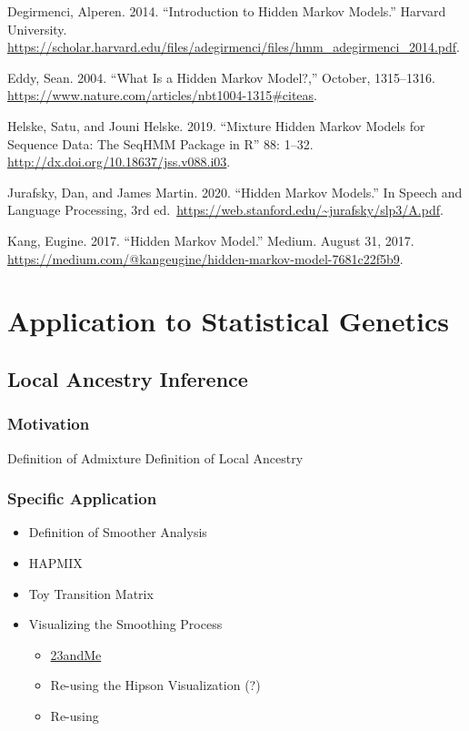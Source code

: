 \documentclass[
]{book}
\providecommand{\tightlist}{%
  \setlength{\itemsep}{0pt}\setlength{\parskip}{0pt}}
\begin{document}
Degirmenci, Alperen. 2014. ``Introduction to Hidden Markov Models.'' Harvard University. \url{https://scholar.harvard.edu/files/adegirmenci/files/hmm_adegirmenci_2014.pdf}.

Eddy, Sean. 2004. ``What Is a Hidden Markov Model?,'' October, 1315--1316. \url{https://www.nature.com/articles/nbt1004-1315\#citeas}.

Helske, Satu, and Jouni Helske. 2019. ``Mixture Hidden Markov Models for Sequence Data: The SeqHMM Package in R'' 88: 1--32. \url{http://dx.doi.org/10.18637/jss.v088.i03}.

Jurafsky, Dan, and James Martin. 2020. ``Hidden Markov Models.'' In Speech and Language Processing, 3rd ed.~\url{https://web.stanford.edu/~jurafsky/slp3/A.pdf}.

Kang, Eugine. 2017. ``Hidden Markov Model.'' Medium. August 31, 2017. \url{https://medium.com/@kangeugine/hidden-markov-model-7681c22f5b9}.

\hfill\break

\hypertarget{application-to-statistical-genetics}{%
\chapter{Application to Statistical Genetics}\label{application-to-statistical-genetics}}

\hypertarget{local-ancestry-inference}{%
\section{Local Ancestry Inference}\label{local-ancestry-inference}}

\hypertarget{motivation}{%
\subsection{Motivation}\label{motivation}}

Definition of Admixture
Definition of Local Ancestry

\hypertarget{specific-application}{%
\subsection{Specific Application}\label{specific-application}}

\begin{itemize}
\tightlist
\item
  Definition of Smoother Analysis
\item
  HAPMIX
\item
  Toy Transition Matrix
\item
  Visualizing the Smoothing Process

  \begin{itemize}
  \tightlist
  \item
    \href{https://customercare.23andme.com/hc/en-us/articles/115004339467-How-Ancestry-Composition-Works}{23andMe}
  \item
    Re-using the Hipson Visualization (?)
  \item
    Re-using
  \end{itemize}
\end{itemize}
\end{document}
